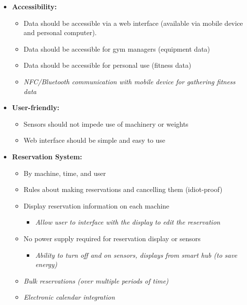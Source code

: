 \documentclass[letterpaper,11pt]{texMemo} %
\begin{document}
\begin{itemize}
    \item{\textbf{Accessibility:}}
    \begin{itemize}
        \item{Data should be accessible via a web interface (available via mobile device and personal computer).}
        \item{Data should be accessible for gym managers (equipment data)}
        \item{Data should be accessible for personal use (fitness data)}
        \item{\textit{NFC/Bluetooth communication with mobile device for gathering fitness data}}
    \end{itemize}

    \item{\textbf{User-friendly:}}
    \begin{itemize}
        \item{Sensors should not impede use of machinery or weights}
        \item{Web interface should be simple and easy to use}
    \end{itemize}

    \item{\textbf{Reservation System:}}
    \begin{itemize}
        \item{By machine, time, and user}
        \item{Rules about making reservations and cancelling them (idiot-proof)}
        \item{Display reservation information on each machine}
        \begin{itemize}
            \item{\textit{Allow user to interface with the display to edit the reservation}}
        \end{itemize}
        \item{No power supply required for reservation display or sensors}
        \begin{itemize}
            \item{\textit{Ability to turn off and on sensors, displays from smart hub (to save energy)}}
        \end{itemize}
        \item{\textit{Bulk reservations (over multiple periods of time)}}
        \item{\textit{Electronic calendar integration}}
    \end{itemize}


\end{itemize}
\end{document}
